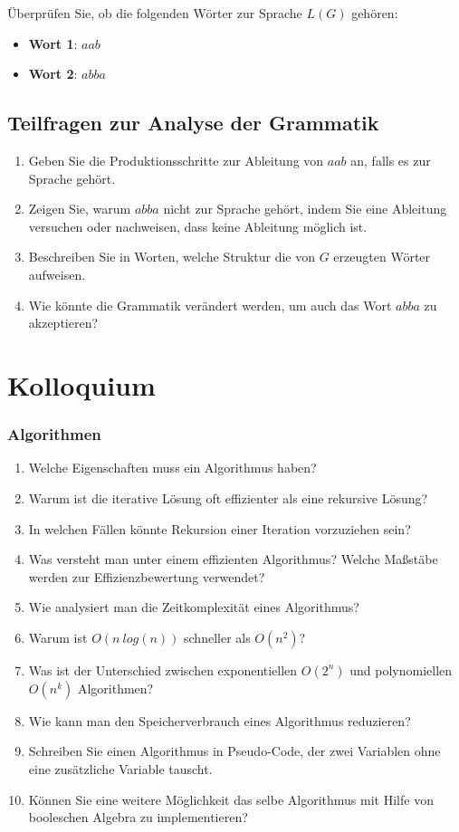 \documentclass[a4paper,12pt]{article}
\begin{document}
	Überprüfen Sie, ob die folgenden Wörter zur Sprache \( L(G) \) gehören:
	\begin{itemize}
		\item \textbf{Wort 1}: \( aab \)
		\item \textbf{Wort 2}: \( abba \)
	\end{itemize}
	
	\subsection*{Teilfragen zur Analyse der Grammatik}
	
	\begin{enumerate}
		\item Geben Sie die Produktionsschritte zur Ableitung von \( aab \) an, falls es zur Sprache gehört.
		\item Zeigen Sie, warum \( abba \) nicht zur Sprache gehört, indem Sie eine Ableitung versuchen oder nachweisen, dass keine Ableitung möglich ist.
		\item Beschreiben Sie in Worten, welche Struktur die von \( G \) erzeugten Wörter aufweisen.
		\item Wie könnte die Grammatik verändert werden, um auch das Wort \( abba \) zu akzeptieren?
	\end{enumerate}
	

	
	\vspace{1cm}
	
	\section*{Kolloquium}
	\subsubsection*{Algorithmen}
	\begin{enumerate}
		\item Welche Eigenschaften muss ein Algorithmus haben?
		\item Warum ist die iterative Lösung oft effizienter als eine rekursive Lösung?
		\item In welchen Fällen könnte Rekursion einer Iteration vorzuziehen sein?
		\item Was versteht man unter einem effizienten Algorithmus? Welche Maßstäbe werden zur Effizienzbewertung verwendet?
		\item Wie analysiert man die Zeitkomplexität eines Algorithmus?
		\item Warum ist $O(n \ log(n))$ schneller als $O(n^2)$?
		\item Was ist der Unterschied zwischen exponentiellen $O(2^n)$ und polynomiellen $O(n^k)$ Algorithmen?
		\item Wie kann man den Speicherverbrauch eines Algorithmus reduzieren?
		\item Schreiben Sie einen Algorithmus in Pseudo-Code, der zwei Variablen ohne eine zusätzliche Variable tauscht.
		\item Können Sie eine weitere Möglichkeit das selbe Algorithmus mit Hilfe von booleschen Algebra zu implementieren?	
		
			
	\end{enumerate}
\end{document}
